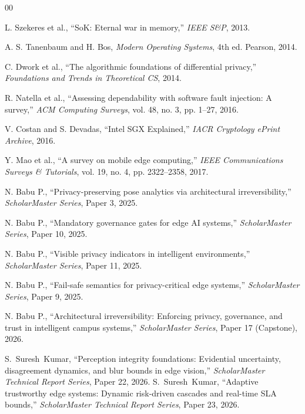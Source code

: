 \documentclass[conference]{IEEEtran}
\begin{document}
\begin{thebibliography}{00}

 L. Szekeres et al., ``SoK: Eternal war in memory,'' \textit{IEEE S\&P}, 2013.


 A. S. Tanenbaum and H. Bos, \textit{Modern Operating Systems}, 4th ed. Pearson, 2014.

 C. Dwork et al., ``The algorithmic foundations of differential privacy,'' \textit{Foundations and Trends in Theoretical CS}, 2014.


 R. Natella et al., ``Assessing dependability with software fault injection: A survey,'' \textit{ACM Computing Surveys}, vol. 48, no. 3, pp. 1--27, 2016.

 V. Costan and S. Devadas, ``Intel SGX Explained,'' \textit{IACR Cryptology ePrint Archive}, 2016.

 Y. Mao et al., ``A survey on mobile edge computing,'' \textit{IEEE Communications Surveys \& Tutorials}, vol. 19, no. 4, pp. 2322--2358, 2017.


 N. Babu P., ``Privacy-preserving pose analytics via architectural irreversibility,'' \textit{ScholarMaster Series}, Paper 3, 2025.

 N. Babu P., ``Mandatory governance gates for edge AI systems,'' \textit{ScholarMaster Series}, Paper 10, 2025.

 N. Babu P., ``Visible privacy indicators in intelligent environments,'' \textit{ScholarMaster Series}, Paper 11, 2025.

 N. Babu P., ``Fail-safe semantics for privacy-critical edge systems,'' \textit{ScholarMaster Series}, Paper 9, 2025.

 N. Babu P., ``Architectural irreversibility: Enforcing privacy, governance, and trust in intelligent campus systems,'' \textit{ScholarMaster Series}, Paper 17 (Capstone), 2026.

 S.~Suresh~Kumar, ``Perception integrity foundations: Evidential uncertainty, disagreement dynamics, and blur bounds in edge vision,'' \emph{ScholarMaster Technical Report Series}, Paper 22, 2026.
 S.~Suresh~Kumar, ``Adaptive trustworthy edge systems: Dynamic risk-driven cascades and real-time SLA bounds,'' \emph{ScholarMaster Technical Report Series}, Paper 23, 2026.
\end{thebibliography}
\end{document}
